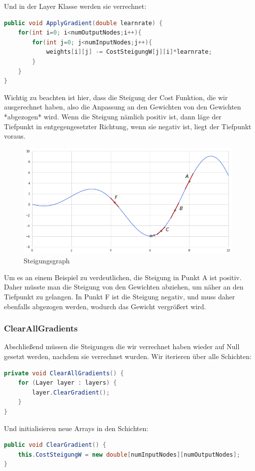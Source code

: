 \documentclass[12pt]{article}
\begin{document}
Und in der Layer Klasse werden sie verrechnet:\begin{lstlisting}[language=Java]
public void ApplyGradient(double learnrate) {
    for(int i=0; i<numOutputNodes;i++){
        for(int j=0; j<numInputNodes;j++){
            weights[i][j] -= CostSteigungW[j][i]*learnrate;
        }
    }
}
\end{lstlisting}
Wichtig zu beachten ist hier, dass die Steigung der Cost Funktion, die wir ausgerechnet haben, also die Anpassung an den Gewichten von den Gewichten *abgezogen* wird. Wenn die Steigung nämlich positiv ist, dann läge der Tiefpunkt in entgegengesetzter Richtung, wenn sie negativ ist, liegt der Tiefpunkt voraus.\begin{figure}[H]
\centering
\includegraphics[scale=0.55]{./Images/Pasted image 20230917195146.png}
\caption{Steigungsgraph}
\label{Steigungsgraph}
\end{figure}
Um es an einem Beispiel zu verdeutlichen, die Steigung in Punkt A ist positiv. Daher müsste man die Steigung von den Gewichten abziehen, um näher an den Tiefpunkt zu gelangen. In Punkt F ist die Steigung negativ, und muss daher ebenfalls abgezogen werden, wodurch das Gewicht vergrößert wird.\subsubsection{ClearAllGradients}Abschließend müssen die Steigungen die wir verrechnet haben wieder auf Null gesetzt werden, nachdem sie verrechnet wurden.
Wir iterieren über alle Schichten:\begin{lstlisting}[language=Java]
private void ClearAllGradients() {
    for (Layer layer : layers) {
        layer.ClearGradient();
    }
}
\end{lstlisting}
Und initialisieren neue Arrays in den Schichten:
\begin{lstlisting}[language=Java]
public void ClearGradient() {
    this.CostSteigungW = new double[numInputNodes][numOutputNodes];
}
\end{lstlisting}
\end{document}

